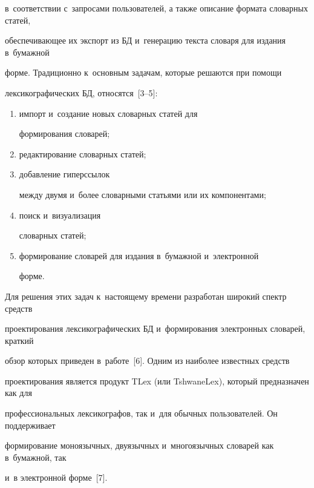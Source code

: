 в~соответствии с~запросами пользователей, а также описание формата словарных статей, 

обеспечивающее их экспорт из БД и~генерацию текста словаря для издания в~бумажной 

форме. Традиционно к~основным задачам, которые решаются при помощи 

лексикографических БД, относятся~[3--5]: 

\begin{enumerate}[(1)]

\item импорт и~создание новых словарных статей для 

формирования словарей;\\[-10pt]

 \item редактирование словарных статей;\\[-10pt]

 \item добавление гиперссылок 

между двумя и~более словарными статьями или их компонентами;\\[-10pt] 

\item поиск и~визуализация 

словарных статей;\\[-10pt] 

\item формирование словарей для издания в~бумажной и~электронной 

форме.

  \end{enumerate}

  

  Для решения этих задач к~настоящему времени разработан широкий спектр средств 

проектирования лексикографических БД и~формирования электронных словарей, краткий 

обзор которых приведен в~работе~[6]. Одним из наиболее известных средств 

проектирования является продукт TLex (или TshwaneLex), который предназначен как для 

профессиональных лексикографов, так и~для обычных пользователей. Он поддерживает 

формирование моноязычных, двуязычных и~многоязычных словарей как в~бумажной, так 

и~в электронной форме~[7].

  

